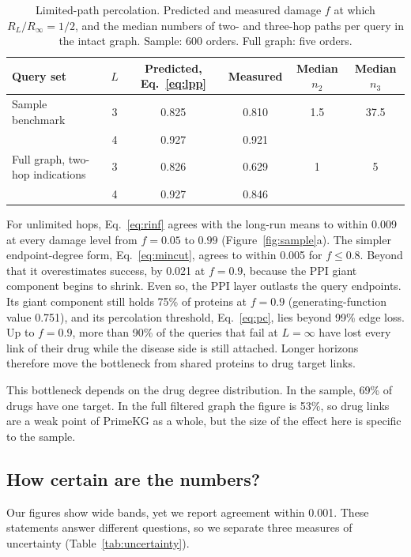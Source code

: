 \begin{table}[!htbp]
\centering
\small
\caption{Limited-path percolation. Predicted and measured damage $f$ at which
$R_L/R_\infty=1/2$, and the median numbers of two- and three-hop paths per query
in the intact graph. Sample: 600 orders. Full graph: five orders.}
\label{tab:lpp}
\begin{tabular}{@{}lccccc@{}}
\toprule
Query set & $L$ & Predicted, Eq.~\eqref{eq:lpp} & Measured & Median $n_2$ & Median $n_3$ \\
\midrule
Sample benchmark          & 3 & 0.825 & 0.810 & 1.5 & 37.5 \\
                          & 4 & 0.927 & 0.921 &     &      \\
Full graph, two-hop indications & 3 & 0.826 & 0.629 & 1   & 5    \\
                          & 4 & 0.927 & 0.846 &     &      \\
\bottomrule
\end{tabular}
\end{table}

For unlimited hops, Eq.~\eqref{eq:rinf} agrees with the long-run means to within
0.009 at every damage level from $f=0.05$ to $0.99$ (Figure~\ref{fig:sample}a).
The simpler endpoint-degree form, Eq.~\eqref{eq:mincut}, agrees to within 0.005 for
$f\le0.8$. Beyond that it overestimates success, by 0.021 at $f=0.9$, because
the PPI giant component begins to shrink. Even so, the PPI layer outlasts the
query endpoints. Its giant component still holds 75\% of proteins at $f=0.9$
(generating-function value 0.751), and its percolation threshold, Eq.~\eqref{eq:pc}, lies beyond
99\% edge loss. Up to $f=0.9$, more than 90\% of the queries that fail at
$L=\infty$ have lost every link of their drug while the disease side is still
attached. Longer horizons therefore move the bottleneck from shared proteins to
drug target links.

This bottleneck depends on the drug degree distribution. In the sample, 69\% of
drugs have one target. In the full filtered graph the figure is 53\%, so drug
links are a weak point of PrimeKG as a whole, but the size of the effect here
is specific to the sample.

\subsection{How certain are the numbers?}
\label{sec:blind-uncertainty}

Our figures show wide bands, yet we report agreement within 0.001. These
statements answer different questions, so we separate three measures of
uncertainty (Table~\ref{tab:uncertainty}).

